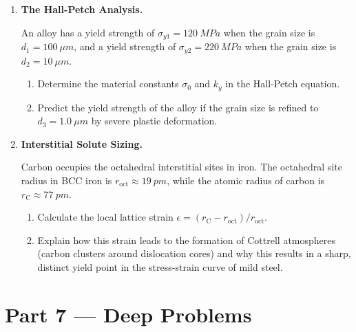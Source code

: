 \documentclass[12pt, a4paper]{book}
\begin{document}
\begin{problembox}
\begin{enumerate}[label=\textbf{P\arabic*.}]
  \item \textbf{The Hall-Petch Analysis.}
  
        An alloy has a yield strength of $\sigma_{y1} = \SI{120}{MPa}$ when the grain size is $d_1 = \SI{100}{\mu m}$, and a yield strength of $\sigma_{y2} = \SI{220}{MPa}$ when the grain size is $d_2 = \SI{10}{\mu m}$.
        \begin{enumerate}[label=(\alph*)]
          \item Determine the material constants $\sigma_0$ and $k_y$ in the Hall-Petch equation.
          \item Predict the yield strength of the alloy if the grain size is refined to $d_3 = \SI{1.0}{\mu m}$ by severe plastic deformation.
        \end{enumerate}

  \item \textbf{Interstitial Solute Sizing.}
  
        Carbon occupies the octahedral interstitial sites in iron. The octahedral site radius in BCC iron is $r_{\text{oct}} \approx \SI{19}{pm}$, while the atomic radius of carbon is $r_{\text{C}} \approx \SI{77}{pm}$.
        \begin{enumerate}[label=(\alph*)]
          \item Calculate the local lattice strain $\epsilon = (r_{\text{C}} - r_{\text{oct}})/r_{\text{oct}}$.
          \item Explain how this strain leads to the formation of Cottrell atmospheres (carbon clusters around dislocation cores) and why this results in a sharp, distinct yield point in the stress-strain curve of mild steel.
        \end{enumerate}
\end{enumerate}
\end{problembox}

\newpage

\section{Part 7 --- Deep Problems}
\end{document}
